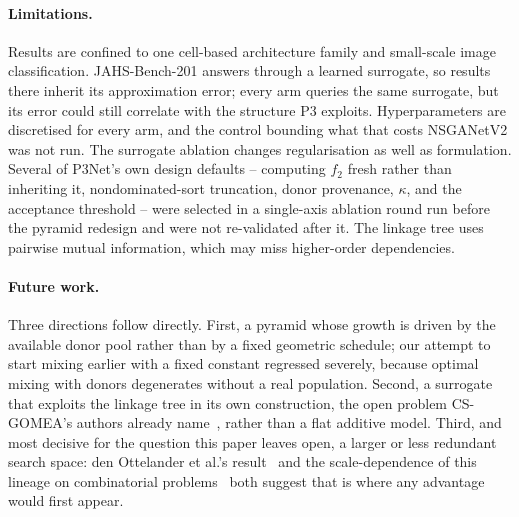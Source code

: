 \paragraph{Limitations.} Results are confined to one cell-based architecture family and small-scale image
classification. JAHS-Bench-201 answers through a learned surrogate, so results there inherit its approximation
error; every arm queries the same surrogate, but its error could still correlate with the structure P3 exploits.
Hyperparameters are discretised for every arm, and the control bounding what that costs NSGANetV2 was not run.
The surrogate ablation changes regularisation as well as formulation. Several of P3Net's own design defaults --
computing $f_2$ fresh rather than inheriting it, nondominated-sort truncation, donor provenance, $\kappa$, and the
acceptance threshold -- were selected in a single-axis ablation round run before the pyramid redesign and were not
re-validated after it. The linkage tree uses pairwise mutual information, which may miss higher-order dependencies.

\paragraph{Future work.} Three directions follow directly. First, a pyramid whose growth is driven by the
available donor pool rather than by a fixed geometric schedule; our attempt to start mixing earlier with a
fixed constant regressed severely, because optimal mixing with donors degenerates without a real population.
Second, a surrogate that exploits the linkage tree in its own construction, the open problem CS-GOMEA's authors
already name~\citep{dushatskiy2019csgomea}, rather than a flat additive model. Third, and most decisive for the
question this paper leaves open, a larger or less redundant search space: den Ottelander et al.'s
result~\citep{denottelander2021localsearch} and the scale-dependence of this lineage on combinatorial
problems~\citep{goldman2015fast,qiao2024gomearuntime} both suggest that is where any advantage would first appear.
